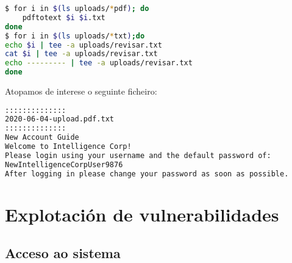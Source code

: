 \documentclass[a4paper]{article}
\begin{document}
        \begin{lstlisting}[language=Bash, caption=pdftotext]
$ for i in $(ls uploads/*pdf); do 
    pdftotext $i $i.txt
done
$ for i in $(ls uploads/*txt);do
echo $i | tee -a uploads/revisar.txt
cat $i | tee -a uploads/revisar.txt
echo --------- | tee -a uploads/revisar.txt
done\end{lstlisting}

Atopamos de interese o seguinte ficheiro:
        \begin{lstlisting}[language=Bash, caption=Contrasinal por defecto]
::::::::::::::
2020-06-04-upload.pdf.txt
::::::::::::::
New Account Guide
Welcome to Intelligence Corp!
Please login using your username and the default password of:
NewIntelligenceCorpUser9876
After logging in please change your password as soon as possible.\end{lstlisting}

        \section{Explotación de vulnerabilidades}
        \vspace{0.2cm}
        \subsection{Acceso ao sistema}
        \vspace{0.2cm}
\end{document}
